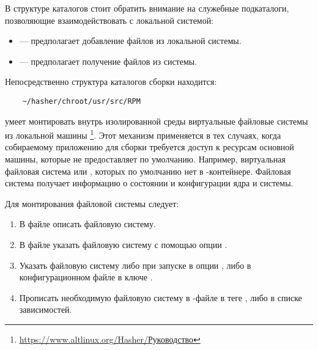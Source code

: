 В структуре каталогов  стоит обратить внимание на служебные подкаталоги,
позволяющие взаимодействовать с локальной системой:
\begin{itemize}
	\item {} --- предполагает добавление файлов из локальной системы.
	\item {} --- предполагает получение файлов из  системы.
\end{itemize}

Непосредственно структура каталогов  сборки находится:
\begin{verbatim}
	~/hasher/chroot/usr/src/RPM
\end{verbatim}

 умеет монтировать внутрь изолированной среды виртуальные файловые системы
из локальной машины%
\footnote{\href{https://www.altlinux.org/Hasher/\%D0\%A0\%D1\%83\%D0\%BA\%D0\%BE\%D0\%B2\%D0\%BE\%D0\%B4\%D1\%81\%D1\%82\%D0\%B2\%D0\%BE\#\%D0\%9C\%D0\%BE\%D0\%BD\%D1\%82\%D0\%B8\%D1\%80\%D0\%BE\%D0\%B2\%D0\%B0\%D0\%BD\%D0\%B8\%D0\%B5_\%D1\%84\%D0\%B0\%D0\%B9\%D0\%BB\%D0\%BE\%D0\%B2\%D1\%8B\%D1\%85_\%D1\%81\%D0\%B8\%D1\%81\%D1\%82\%D0\%B5\%D0\%BC_\%D0\%B2\%D0\%BD\%D1\%83\%D1\%82\%D1\%80\%D0\%B8_hasher}{https://www.altlinux.org/Hasher/Руководство}}.
Этот механизм применяется в тех случаях, когда собираемому приложению для сборки требуется доступ к ресурсам
основной машины, которые  не предоставляет по умолчанию. Например, виртуальная файловая система
 или , которых по умолчанию нет в -контейнере. Файловая система 
получает информацию о состоянии и конфигурации ядра и системы.

Для монтирования файловой системы следует:
\begin{enumerate}
	\item В файле  описать файловую систему.
	\item В файле  указать файловую систему с помощью опции .
	\item Указать файловую систему либо при запуске  в опции , либо в
	конфигурационном файле  в ключе .
	\item Прописать необходимую файловую систему в -файле в теге , либо в списке зависимостей.
\end{enumerate}


